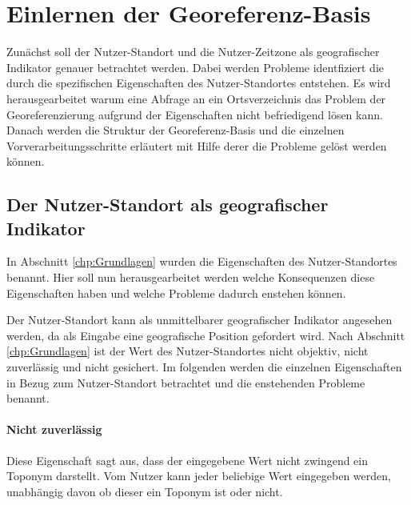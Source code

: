 	\section{Einlernen der Georeferenz-Basis}
	Zunächst soll der Nutzer-Standort und die Nutzer-Zeitzone als geografischer Indikator genauer betrachtet werden. 
	Dabei werden Probleme identfiziert die durch die spezifischen Eigenschaften des Nutzer-Standortes entstehen.
	Es wird herausgearbeitet warum eine Abfrage an ein Ortsverzeichnis das Problem der Georeferenzierung aufgrund der Eigenschaften nicht befriedigend lösen kann.  
	Danach werden die Struktur der Georeferenz-Basis und die einzelnen Vorverarbeitungsschritte erläutert mit Hilfe derer die Probleme gelöst werden können.  
			\subsection{Der Nutzer-Standort als geografischer Indikator} \label{subsec:ulAsgeogInd} 

				In Abschnitt \ref{chp:Grundlagen} wurden die Eigenschaften des Nutzer-Standortes benannt.
				Hier soll nun herausgearbeitet werden welche Konsequenzen diese Eigenschaften haben und welche Probleme dadurch enstehen können.

				Der Nutzer-Standort kann als unmittelbarer geografischer Indikator angesehen werden, da als Eingabe eine geografische Position gefordert wird.  
				Nach Abschnitt \ref{chp:Grundlagen} ist der Wert des Nutzer-Standortes nicht objektiv, nicht zuverlässig und nicht gesichert. 
				Im folgenden werden die einzelnen Eigenschaften in Bezug zum Nutzer-Standort betrachtet und die enstehenden Probleme benannt.
			
			\paragraph{Nicht zuverlässig} 
				
				Diese Eigenschaft sagt aus, dass der eingegebene Wert nicht zwingend ein Toponym darstellt.
				Vom Nutzer kann jeder beliebige Wert eingegeben werden, unabhängig davon ob dieser ein Toponym ist oder nicht.

